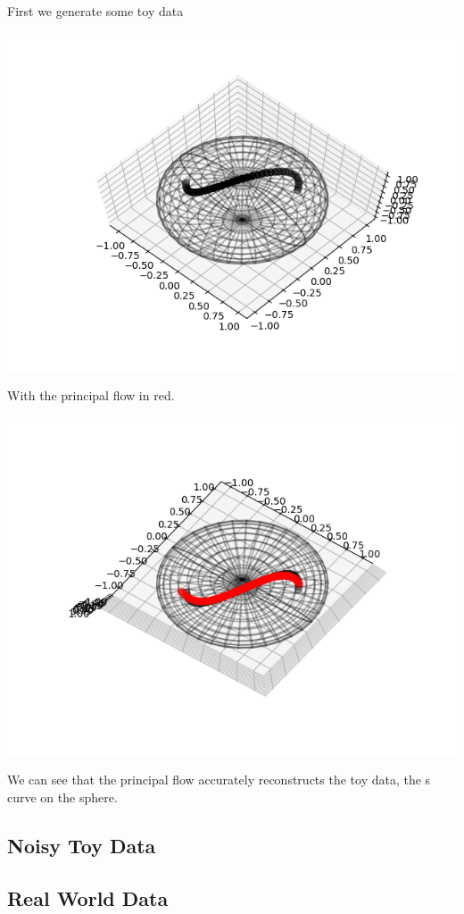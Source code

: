 \documentclass[12pt]{report}
\begin{document}
First we generate some toy data

\includegraphics[]{Data_13.png}

With the principal flow in red.

\includegraphics[]{single_flow_13.png}

We can see that the principal flow accurately reconstructs the toy data, the s curve on the sphere.

\subsection{Noisy Toy Data}

\subsection{Real World Data}
\end{document}
